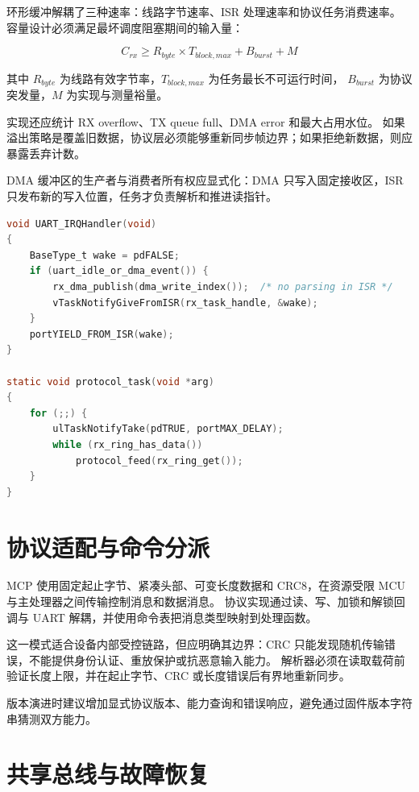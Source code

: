 环形缓冲解耦了三种速率：线路字节速率、ISR 处理速率和协议任务消费速率。
容量设计必须满足最坏调度阻塞期间的输入量：

\begin{equation}
  C_{rx} \geq R_{byte} \times T_{block,max} + B_{burst} + M
\end{equation}

其中 $R_{byte}$ 为线路有效字节率，$T_{block,max}$ 为任务最长不可运行时间，
$B_{burst}$ 为协议突发量，$M$ 为实现与测量裕量。

实现还应统计 RX overflow、TX queue full、DMA error 和最大占用水位。
如果溢出策略是覆盖旧数据，协议层必须能够重新同步帧边界；如果拒绝新数据，则应暴露丢弃计数。

DMA 缓冲区的生产者与消费者所有权应显式化：DMA 只写入固定接收区，ISR 只发布新的写入位置，任务才负责解析和推进读指针。

\begin{lstlisting}[language=C,caption={DMA 接收与任务通知的所有权边界（伪代码）}]
void UART_IRQHandler(void)
{
    BaseType_t wake = pdFALSE;
    if (uart_idle_or_dma_event()) {
        rx_dma_publish(dma_write_index());  /* no parsing in ISR */
        vTaskNotifyGiveFromISR(rx_task_handle, &wake);
    }
    portYIELD_FROM_ISR(wake);
}

static void protocol_task(void *arg)
{
    for (;;) {
        ulTaskNotifyTake(pdTRUE, portMAX_DELAY);
        while (rx_ring_has_data())
            protocol_feed(rx_ring_get());
    }
}
\end{lstlisting}

\section{协议适配与命令分派}

MCP 使用固定起止字节、紧凑头部、可变长度数据和 CRC8，在资源受限 MCU 与主处理器之间传输控制消息和数据消息。
协议实现通过读、写、加锁和解锁回调与 UART 解耦，并使用命令表把消息类型映射到处理函数。

这一模式适合设备内部受控链路，但应明确其边界：CRC 只能发现随机传输错误，不能提供身份认证、重放保护或抗恶意输入能力。
解析器必须在读取载荷前验证长度上限，并在起止字节、CRC 或长度错误后有界地重新同步。

版本演进时建议增加显式协议版本、能力查询和错误响应，避免通过固件版本字符串猜测双方能力。

\section{共享总线与故障恢复}

